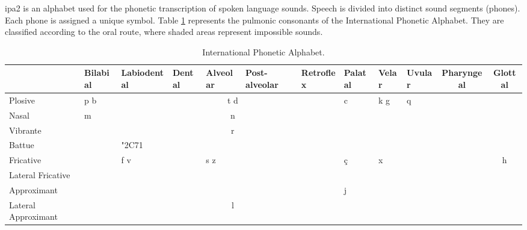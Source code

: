 \documentclass{KBook}
\begin{document}
\ac{ipa2} is an alphabet used for the phonetic transcription of spoken language sounds. Speech is divided into distinct sound segments (phones). Each phone is assigned a unique symbol. Table \ref{tab:ipa} represents the pulmonic consonants of the International Phonetic Alphabet. They are classified according to the oral route, where shaded areas represent impossible sounds.

\setlength\tabcolsep{2pt}
\begin{table}[ht]
	\centering
	\begin{tabular}{|p{1.6cm}|p{0.8cm}|p{1.3cm}|p{0.8cm}|p{1.1cm}|p{1cm}|p{1.2cm}|p{0.8cm}|p{1cm}|p{1cm}|p{0.6cm}|p{0.4cm}|p{0.4cm}|p{0.4cm}|}
		\hline
		& \scriptsize Bilabial & \scriptsize Labiodental & \scriptsize Dental & \scriptsize Alveolar & \scriptsize Post-alveolar & \scriptsize Retroflex & \scriptsize Palatal & \scriptsize Velar & \scriptsize Uvular & \multicolumn{2}{c|}{\scriptsize Pharyngeal} & \multicolumn{2}{c|}{\scriptsize Glottal}\\
		\hline
		\scriptsize Plosive & p b & & \multicolumn{3}{c|}{t d} & \textrtailt \ \textrtaild & c \textbardotlessj & k g & q \textscg & & \cellcolor{gray!50} & \textglotstop & \cellcolor{gray!50} \\
		\hline
		\scriptsize Nasal & m & \textltailm & \multicolumn{3}{c|}{n} & \textrtailn & \textltailn & \ng & \textscn & \multicolumn{2}{c|}{\cellcolor{gray!50}}  & \multicolumn{2}{c|}{\cellcolor{gray!50}} \\
		\hline 
		\scriptsize Vibrante & \textscb & & \multicolumn{3}{c|}{r} &  &  & \cellcolor{gray!50}  & \textscr & \multicolumn{2}{c|}{}  & \multicolumn{2}{c|}{\cellcolor{gray!50}} \\
		\hline
		\scriptsize Battue &  & \char"2C71 & \multicolumn{3}{c|}{\textfishhookr} & \textrtailr  &  & \cellcolor{gray!50} &  & \multicolumn{2}{c|}{}  & \multicolumn{2}{c|}{\cellcolor{gray!50}} \\
		\hline
		\scriptsize Fricative & \textphi \ \textbeta& f v  & \texttheta \ \dh & s z & \textesh \ \textyogh & \textrtails \ \textrtailz  & \c{c} \textctj  & x \textgamma & \textchi \ \textinvscr  & \multicolumn{2}{c|}{\textcrh \ \textrevglotstop}  & \multicolumn{2}{c|}{h \texthth} \\
		\hline
		\scriptsize Lateral Fricative & \cellcolor{gray!50} & \cellcolor{gray!50} & \multicolumn{3}{c|}{\textbeltl \ \textlyoghlig} &   &   &  &  & \multicolumn{2}{c|}{\cellcolor{gray!50}}  & \multicolumn{2}{c|}{\cellcolor{gray!50}} \\
		\hline
		\scriptsize Approximant &  & \textscriptv & \multicolumn{3}{c|}{\textturnr} & \textturnrrtail  & j & \textturnmrleg &  & \multicolumn{2}{c|}{}  & \multicolumn{2}{c|}{\cellcolor{gray!50}} \\
		\hline
		\scriptsize Lateral Approximant & \cellcolor{gray!50} & \cellcolor{gray!50} & \multicolumn{3}{c|}{l} & \textrtaill  & \textturny  & \textscl &  & \multicolumn{2}{c|}{\cellcolor{gray!50}}  & \multicolumn{2}{c|}{\cellcolor{gray!50}} \\
		\hline
		
	\end{tabular}
	\caption{International Phonetic Alphabet.}
	\label{tab:ipa}
\end{table}
\end{document}
